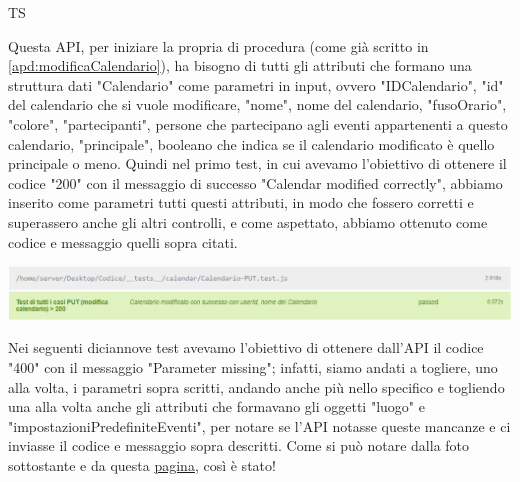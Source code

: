 \begin{listaPersonale}{TS}
\begin{center}
                \end{center}
                \newpage
                Questa API, per iniziare la propria di procedura (come già scritto in \ref{apd:modificaCalendario}), ha bisogno di tutti gli attributi che formano una struttura dati "Calendario" come parametri in input, ovvero "IDCalendario", "id" del calendario che si vuole modificare, "nome", nome del calendario, "fusoOrario", "colore", "partecipanti", persone che partecipano agli eventi appartenenti a questo calendario, "principale", booleano che indica se il calendario modificato è quello principale o meno. Quindi nel primo test, in cui avevamo l'obiettivo di ottenere il codice "200" con il messaggio di successo "Calendar modified correctly", abbiamo inserito come parametri tutti questi attributi, in modo che fossero corretti e superassero anche gli altri controlli, e come aspettato, abbiamo ottenuto come codice e messaggio quelli sopra citati.
                \begin{center}
                        \includegraphics[width=1\textwidth, height=0.08\textheight]{img/png/tests/CalendarioPut/200_putCalendario.png}
                \end{center}
                Nei seguenti diciannove test avevamo l'obiettivo di ottenere dall'API il codice "400" con il messaggio "Parameter missing"; infatti, siamo andati a togliere, uno alla volta, i parametri sopra scritti, andando anche più nello specifico e togliendo una alla volta anche gli attributi che formavano gli oggetti "luogo" e "impostazioniPredefiniteEventi", per notare se l'API notasse queste mancanze e ci inviasse il codice e messaggio sopra descritti. Come si può notare dalla foto sottostante e da questa \href{https://plan-it.it/test-report.html} {pagina}, così è stato!
                \begin{center}

\end{center}
\end{listaPersonale}
